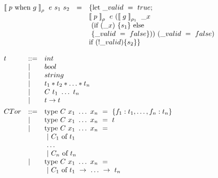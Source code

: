 \begin{center}
$
\begin{array}{lll}
\mathrel{{\llbracket}} p ~ \mbox{when} ~ g \mathrel{{\rrbracket}} _{\rho} ~ e ~ s_1 ~ s_2 &=& \{ \mbox{let} ~ \_valid ~ = ~ true; \\ 
& & \mathrel{{\llbracket}} p \mathrel{{\rrbracket}} _{\rho} ~ e ~ (\mathrel{{\llbracket}} g \mathrel{{\rrbracket}} _{\rho_1} ~ \_x ~ \\
& & ~(\mbox{if} ~ (\_x) ~ \{ s_1 \} ~ \mbox{else} ~ \\ & & ~\{ \_valid ~=~ false \})) ~ (\_valid ~=~ false) \\
& & \mbox{if} ~ (!\_valid) \{ s_2 \} \}
\end{array}
$
\captionsetup{type=lstlisting}
\label{tbl:tr_wos2}
\end{center}

\clearpage

\begin{center}
$
\begin{array}{lll}
t & \bnfdef & int  \\
  & \bnfalt & bool \\
  & \bnfalt & string \\
  & \bnfalt & t_1 * t_2 * \ldots * t_n \\
  & \bnfalt & C ~ t_1 ~ \ldots ~ t_n \\
  & \bnfalt & t \to t \\[1ex]
  
CTor & \bnfdef & \mbox{type}~C~x_1~\ldots ~x_n~=~ \{f_1:t_1, \ldots, f_n:t_n\} \\ 
  & \bnfalt & \mbox{type}~C~x_1~\ldots ~x_n~=~ t \\
  & \bnfalt & \mbox{type}~C~x_1~\ldots ~x_n~=~ \\
  & & ~|~C_1~\mbox{of}~t_1 \\ 
  & & ~\ldots \\
  & & ~|~C_n~\mbox{of}~t_n \\
  & \bnfalt & \mbox{type}~C~x_1~\ldots ~x_n~=~ \\
  & & ~|~C_1~\mbox{of}~t_1~\to~\ldots~\to~t_n
\end{array}
$
\captionsetup{type=lstlisting}
\label{tbl:syntaxml_types}
\end{center}

